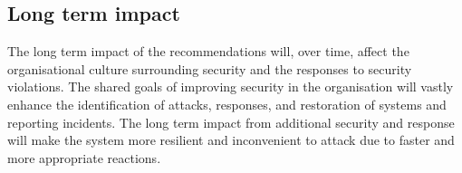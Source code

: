\documentclass[conference]{IEEEtran}
\begin{document}
\subsection{Long term impact}
The long term impact of the recommendations will, over time, affect the organisational culture surrounding security and the responses to security violations. The shared goals of improving security in the organisation will vastly enhance the identification of attacks, responses, and restoration of systems and reporting incidents. The long term impact from additional security and response will make the system more resilient and inconvenient to attack due to faster and more appropriate reactions.
\end{document}
